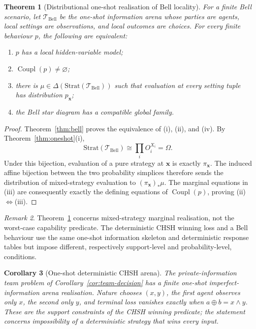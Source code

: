 \documentclass[11pt]{article}
\theoremstyle{plain}
\newtheorem{theorem}{Theorem}[section]
\newtheorem{corollary}[theorem]{Corollary}
\theoremstyle{definition}
\theoremstyle{remark}
\newtheorem{remark}[theorem]{Remark}
\begin{document}
\begin{theorem}[Distributional one-shot realisation of Bell locality]
\label{thm:bell-oneshot}
For a finite Bell scenario, let $\mathcal T_{\mathrm{Bell}}$ be the one-shot
information arena whose parties are agents, local settings are observations, and
local outcomes are choices. For every finite behaviour $p$, the following are
equivalent:
\begin{enumerate}[label=(\roman*)]
\item $p$ has a local hidden-variable model;
\item $\operatorname{Coupl}(p)\ne\varnothing$;
\item there is $\mu\in\Delta(\mathrm{Strat}(\mathcal T_{\mathrm{Bell}}))$
such that evaluation at every setting tuple has distribution $p_{\mathbf x}$;
\item the Bell star diagram has a compatible global family.
\end{enumerate}
\end{theorem}

\begin{proof}
Theorem~\ref{thm:bell} proves the equivalence of (i), (ii), and (iv). By
Theorem~\ref{thm:oneshot}(i),
\[
\mathrm{Strat}(\mathcal T_{\mathrm{Bell}})
\cong\prod_iO_i^{X_i}=\Omega.
\]
Under this bijection, evaluation of a pure strategy at $\mathbf x$ is exactly
$\pi_{\mathbf x}$. The induced affine bijection between the two probability
simplices therefore sends the distribution of mixed-strategy evaluation to
$(\pi_{\mathbf x})_*\mu$. The marginal equations in (iii) are consequently
exactly the defining equations of $\operatorname{Coupl}(p)$, proving
(ii)$\Leftrightarrow$(iii).
\end{proof}

\begin{remark}
Theorem~\ref{thm:bell-oneshot} concerns mixed-strategy marginal realisation, not
the worst-case capability predicate. The deterministic CHSH winning loss and a
Bell behaviour use the same one-shot information skeleton and deterministic
response tables but impose different, respectively support-level and
probability-level, conditions.
\end{remark}

\begin{corollary}[One-shot deterministic CHSH arena]\label{cor:chsh-arena}
The private-information team problem of Corollary~\ref{cor:team-decision} has a
finite one-shot imperfect-information arena realisation. Nature chooses
$(x,y)$, the first agent observes only $x$, the second only $y$, and terminal
loss vanishes exactly when $a\oplus b=x\wedge y$. These are the support
constraints of the CHSH winning predicate; the statement concerns impossibility
of a deterministic strategy that wins every input.
\end{corollary}
\end{document}
